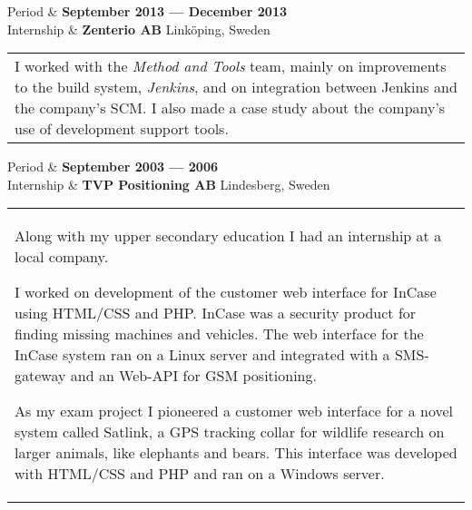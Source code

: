 \documentclass{cv-stylish}
\begin{document}
\begin{center}
\vspace{10pt}

\begin{InfoTable}
 Period & \textbf{September 2013 --- December 2013}\\
 Internship & \textbf{Zenterio AB} \hfill Linköping, Sweden\\
\end{InfoTable}
\begin{tabularx}{0.97\linewidth}{X}
I worked with the \emph{Method and Tools} team, mainly on improvements
to the build system, \emph{Jenkins}, and on integration between Jenkins
and the company's SCM. I also made a case study about the company's
use of development support tools.
\end{tabularx}

\vspace{10pt}

\begin{InfoTable}
 Period & \textbf{September 2003 --- 2006}\\
 Internship & \textbf{TVP Positioning AB} \hfill Lindesberg, Sweden\\
\end{InfoTable}
\begin{tabularx}{0.97\linewidth}{X}
Along with my upper secondary education I had an internship at a local
company.

I worked on development of the customer web interface for InCase using
HTML/CSS and PHP. InCase was a security product for finding missing
machines and vehicles. The web interface for the InCase system ran on
a Linux server and integrated with a SMS-gateway and an Web-API for
GSM positioning.

As my exam project I pioneered a customer web interface for a novel
system called Satlink, a GPS tracking collar for wildlife research on
larger animals, like elephants and bears. This interface was developed
with HTML/CSS and PHP and ran on a Windows server.

\end{tabularx}





\end{center}
\end{document}
